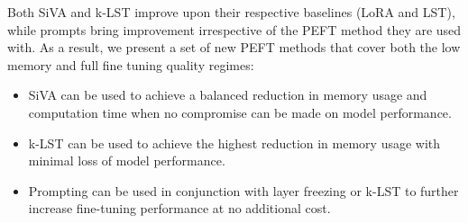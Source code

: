 Both SiVA and k-LST improve upon their respective baselines (LoRA and LST), while prompts bring improvement irrespective of the PEFT method they are used with. As a result, we present a set of new PEFT methods that cover both the low memory and full fine tuning quality regimes:

\begin{itemize}
    \item SiVA can be used to achieve a balanced reduction in memory usage and computation time when no compromise can be made on model performance.
    \item k-LST can be used to achieve the highest reduction in memory usage with minimal loss of model performance.
    \item Prompting can be used in conjunction with layer freezing or k-LST to further increase fine-tuning performance at no additional cost.
\end{itemize}
